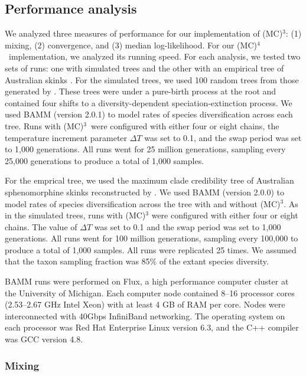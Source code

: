 \documentclass[12pt]{article}
\newcommand{\MCMCMC}{(MC)$^{3}$}
\newcommand{\MCMCMCMC}{(MC)$^{4}$}
\begin{document}
\subsection*{Performance analysis}

We analyzed three measures of performance for our implementation of \MCMCMC:
(1) mixing, (2) convergence, and (3) median log-likelihood.
%
For our \MCMCMCMC\ implementation, we analyzed its running speed.
%
For each analysis, we tested two sets of runs: one with simulated trees
and the other with an empirical tree of Australian skinks \citep{rab14sysbio}.
%
For the simulated trees, we used 100 random trees
from those generated by \citet{rab14plos}.
%
These trees were under a pure-birth process at the root and
contained four shifts to a diversity-dependent speciation-extinction process.
%
We used BAMM (version 2.0.1) to model rates of species diversification
across each tree.
%
Runs with \MCMCMC\ were configured with either four or eight chains,
the temperature increment parameter $\Delta T$ was set to 0.1,
and the swap period was set to 1,000 generations.
%
All runs went for 25 million generations,
sampling every 25,000 generations to produce a total of 1,000 samples.


For the emprical tree, we used the maximum clade credibility tree
of Australian sphenomorphine skinks reconstructed by \citet{rab14sysbio}.
%
We used BAMM (version 2.0.0) to model rates of species diversification
across the tree with and without \MCMCMC.
%
As in the simulated trees, runs with \MCMCMC
were configured with either four or eight chains.
%
The value of $\Delta T$ was set to 0.1
and the swap period was set to 1,000 generations.
%
All runs went for 100 million generations,
sampling every 100,000 to produce a total of 1,000 samples.
%
All runs were replicated 25 times.
%
We assumed that the taxon sampling fraction was 85\%
of the extant species diversity.


BAMM runs were performed on Flux,
a high performance computer cluster at the University of Michigan.
%
Each computer node contained 8--16 processor cores
(2.53--2.67 GHz Intel Xeon) with at least 4 GB of RAM per core.
%
Nodes were interconnected with 40Gbps InfiniBand networking.
%
The operating system on each processor
was Red Hat Enterprise Linux version 6.3,
and the C++ compiler was GCC version 4.8.


\subsubsection*{Mixing}
\end{document}

